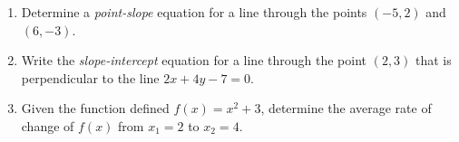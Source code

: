 

\begin{enumerate}
\item Determine a \emph{point-slope} equation for a line through the
  points $(-5,2)$ and $(6,-3)$.

  \vfill
  
\item Write the \emph{slope-intercept} equation for a line through the
  point $(2,3)$ that is perpendicular to the line $2x+4y-7=0$.

\vfill

\item Given the function defined $f(x)=x^2+3$, determine the average
  rate of change of $f(x)$ from $x_1=2$ to $x_2=4$.

  \vfill



\end{enumerate}



